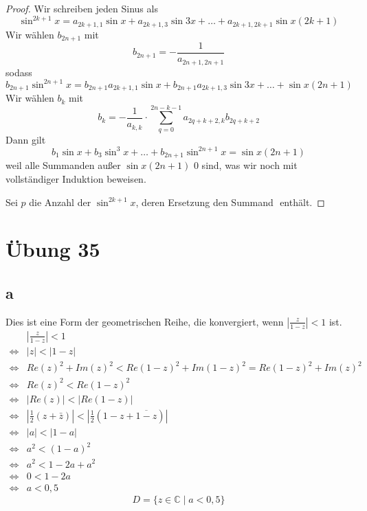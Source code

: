 \documentclass[a4paper,10pt]{article}
\begin{document}
\begin{proof}
 Wir schreiben jeden Sinus als
 \begin{equation}
  \sin^{2k + 1} x = a_{2k + 1, 1} \sin x + a_{2k + 1, 3} \sin 3x + \dots + a_{2k + 1, 2k + 1} \sin x(2k + 1)
 \end{equation}
 Wir wählen $b_{2n + 1}$ mit
 \begin{equation}
  b_{2n + 1} = -\frac{1}{a_{2n + 1, 2n + 1}}
 \end{equation}
 sodass
 \begin{equation}
  b_{2n + 1}\sin^{2n + 1} x = b_{2n + 1}a_{2k + 1, 1} \sin x + b_{2n + 1}a_{2k + 1, 3} \sin 3x + \dots + \sin x(2n + 1)
 \end{equation}
 Wir wählen $b_k$ mit
 \begin{equation}
  b_k = -\frac{1}{a_{k,k}} \cdot \sum_{q = 0}^{2n - k - 1} a_{2q + k + 2, k}b_{2q + k + 2}
 \end{equation}
 Dann gilt
 \begin{equation}
  b_1 \sin x + b_3 \sin^3 x + \dots + b_{2n + 1} \sin^{2n + 1} x = \sin x(2n + 1)
 \end{equation}
 weil alle Summanden außer $\sin x(2n + 1)$ $0$ sind, was wir noch mit vollständiger Induktion beweisen.
 
 Sei $p$ die Anzahl der $\sin^{2k + 1} x$, deren Ersetzung den Summand $ $ enthält.
\end{proof}

\section*{Übung 35}

\subsection*{a}

Dies ist eine Form der geometrischen Reihe, die konvergiert, wenn $\left|\frac{z}{1 - z}\right| < 1$ ist.
\begin{align}
 & \left|\frac{z}{1 - z}\right| < 1\\
 \Leftrightarrow & |z| < |1 - z|\\
 \Leftrightarrow & Re(z)^2 + Im(z)^2 < Re(1 - z)^2 + Im(1 - z)^2 = Re(1 - z)^2 + Im(z)^2\\
 \Leftrightarrow & Re(z)^2 < Re(1 - z)^2\\
 \Leftrightarrow & |Re(z)| < |Re(1 - z)|\\
 \Leftrightarrow & |\frac{1}{2}(z + \bar{z})| < |\frac{1}{2}(1 - z + \overline{1 - z})|\\
 \Leftrightarrow & |a| < |1 - a|\\
 \Leftrightarrow & a^2 < (1 - a)^2\\
 \Leftrightarrow & a^2 < 1 - 2a + a^2\\
 \Leftrightarrow & 0 < 1 - 2a\\
 \Leftrightarrow & a < 0,5
\end{align}
\begin{equation}
 D = \{z \in \mathbb{C} \mid a < 0,5\}
\end{equation}
\end{document}
